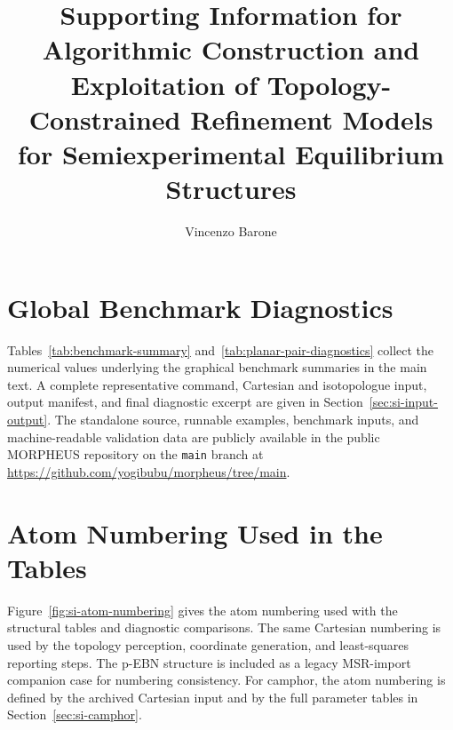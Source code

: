\documentclass[12pt]{article}
\title{Supporting Information for\\
Algorithmic Construction and Exploitation of Topology-Constrained Refinement Models for Semiexperimental Equilibrium Structures}
\author{Vincenzo Barone}
\date{}
\begin{document}
\maketitle

\section{Global Benchmark Diagnostics}

Tables~\ref{tab:benchmark-summary} and~\ref{tab:planar-pair-diagnostics}
collect the numerical values underlying the graphical benchmark summaries in
the main text. A complete representative command, Cartesian and isotopologue
input, output manifest, and final diagnostic excerpt are given in
Section~\ref{sec:si-input-output}. The standalone source, runnable examples,
benchmark inputs, and machine-readable validation data are publicly available
in the public MORPHEUS repository on the \texttt{main} branch at
\url{https://github.com/yogibubu/morpheus/tree/main}.





\section{Atom Numbering Used in the Tables}

Figure~\ref{fig:si-atom-numbering} gives the atom numbering used with the
structural tables and diagnostic comparisons. The same Cartesian numbering is
used by the topology perception, coordinate generation, and least-squares
reporting steps. The p-EBN structure is included as a legacy MSR-import
companion case for numbering consistency. For camphor, the atom numbering is
defined by the archived Cartesian input and by the full parameter tables in
Section~\ref{sec:si-camphor}.
\end{document}
